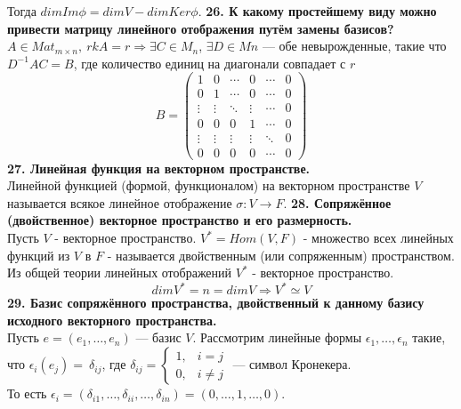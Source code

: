 \documentclass{article}
\begin{document}
Тогда $dim Im \phi = dim V - dim Ker \phi$.
\newline
\newline
\textbf{26. К какому простейшему виду можно привести матрицу линейного отображения путём замены базисов?}\\
$A \in Mat_{m\times n}, ~rkA=r \Rightarrow \exists C\in M_n$, $\exists D \in Mn$ --- обе невырожденные, такие что $D^{-1}AC=B$, где количество единиц на диагонали совпадает с $r$
$$
B=
\begin{pmatrix}
1 & 0 & \cdots & 0 &  \cdots & 0 \\
0 & 1 & \cdots & 0 &  \cdots & 0 \\
\vdots & \vdots & \ddots & \vdots& \cdots & 0\\
0 & 0 & 0 & 1&  \cdots & 0\\
\vdots & \vdots & \vdots & \vdots &  \ddots & 0\\
0 & 0 & 0 & 0 & \cdots &0 
\end{pmatrix}
$$
\newline
\newline
\textbf{27. Линейная функция на векторном пространстве.}\\
Линейной функцией (формой, функционалом) на векторном пространстве $V$ называется всякое линейное отображение $\sigma \colon V \rightarrow F$.
\newline
\newline
\textbf{28. Сопряжённое (двойственное) векторное пространство и его размерность.}\\
Пусть $V$ - векторное пространство. $V^*=Hom(V,F)$ - множество всех линейных функций из  $V$ в $F$ - называется двойственным (или сопряженным) пространством.\\ 
Из общей теории линейных отображений $V^*$ - векторное пространство.
    $$dimV^*=n=dimV \Rightarrow V^* \simeq V$$
\newline
\newline
\textbf{29. Базис сопряжённого пространства, двойственный к данному базису исходного векторного пространства.}\\
Пусть $e = (e_1, \ldots, e_n)$ --- базис $V$. Рассмотрим линейные формы $\epsilon_1, \ldots, \epsilon_n$ такие, что $\epsilon_i(e_j) =~\delta_{ij}$, где $\delta_{ij} =
\begin{cases}
1, & i = j \\
0, & i \neq j
\end{cases}
$ --- символ Кронекера. \\То есть $\epsilon_i = (\delta_{i1}, \ldots, \delta_{ii}, \ldots, \delta_{in}) = (0, \ldots, 1, \ldots, 0)$.
\end{document}
